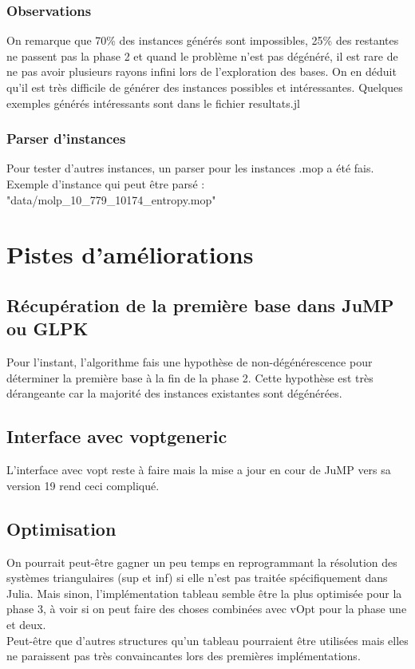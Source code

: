 \documentclass[a4paper,10pt]{article}
\theoremstyle{plain}
\begin{document}
\subsubsection{Observations}
On remarque que 70\% des instances générés sont impossibles, 25\% des restantes ne passent pas la phase 2 et quand le problème n'est pas dégénéré, il est rare de ne pas avoir plusieurs rayons infini lors de l'exploration des bases. On en déduit qu'il est très difficile de générer des instances possibles et intéressantes. Quelques exemples générés intéressants sont dans le fichier resultats.jl

\subsubsection{Parser d'instances}
Pour tester d'autres instances, un parser pour les instances .mop a été fais. \\
Exemple d'instance qui peut être parsé : "data/molp\_10\_779\_10174\_entropy.mop"

\section{Pistes d'améliorations}
\subsection{Récupération de la première base dans JuMP ou GLPK}
Pour l'instant, l'algorithme fais une hypothèse de non-dégénérescence pour déterminer la première base à la fin de la phase 2. Cette hypothèse est très dérangeante car la majorité des instances existantes sont dégénérées.
\subsection{Interface avec voptgeneric}
L'interface avec vopt reste à faire mais la mise a jour en cour de JuMP vers sa version 19 rend ceci compliqué.
\subsection{Optimisation}
On pourrait peut-être gagner un peu temps en reprogrammant la résolution des systèmes triangulaires (sup et inf) si elle n'est pas traitée spécifiquement dans Julia. Mais sinon, l'implémentation tableau semble être la plus optimisée pour la phase 3, à voir si on peut faire des choses combinées avec vOpt pour la phase une et deux. \\
Peut-être que d'autres structures qu'un tableau pourraient être utilisées mais elles ne paraissent pas très convaincantes lors des premières implémentations.
\end{document}
